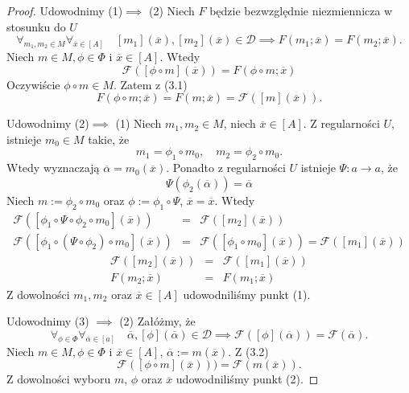 \documentclass[12pt,a4paper]{report}
\newcommand{\domkniecie}[1]{\left[ {#1} \right] }
\begin{document}
\begin{proof}
Udowodnimy (1)$\implies$ (2)
Niech $F$ będzie bezwzględnie niezmiennicza w stosunku do $U$
\begin{equation}
\forall_{m_{1}, m_{2} \in M}  \forall_{\overline{x} \in \domkniecie{A}} \quad \domkniecie{m_1}(\overline{x}), \domkniecie{m_2}(\overline{x})\in \mathcal{D} \implies F(m_{1};\overline{x})=F(m_{2};\overline{x}).
\end{equation}
Niech $m \in M, \phi \in \Phi$ i $\overline{x} \in \domkniecie{A}$. Wtedy
$$
\mathcal{F}(\domkniecie{\phi \circ m}(\overline{x}))=F(\phi \circ m;\overline{x})
$$
Oczywiście $\phi \circ m \in M$. Zatem z (3.1)
$$
F(\phi \circ m; \overline{x})=F(m;\overline{x})=\mathcal{F}(\domkniecie{m}(\overline{x})).
$$

Udowodnimy (2)$\implies$ (1)
Niech $m_1,m_2 \in M$, niech $\overline{x} \in\domkniecie{A}$.
Z regularności $U$, istnieje $m_0\in M$ takie, że
$$
m_1=\phi_1\circ m_0, \quad m_2=\phi_2\circ m_0.
$$
Wtedy wyznaczają $\overline{\alpha}=m_0(\overline{x})$.
Ponadto z regularności $U$ istnieje $\Psi:a\to a$, że
$$
 \Psi(\phi_2(\overline{\alpha}))=\overline{\alpha}
$$
Niech $m:=\phi_2\circ m_0$ oraz $\phi:=\phi_1\circ\Psi$, $\overline{x}=\overline{x}$. Wtedy
\begin{eqnarray*}
\mathcal{F}(\domkniecie{\phi_1\circ \Psi\circ \phi_2 \circ m_0}(\overline{x})) & = & \mathcal{F}(\domkniecie{m_2}(\overline{x})) \\
\mathcal{F}(\domkniecie{\phi_1\circ(\Psi\circ \phi_2)\circ m_0}(\overline{x})) & = & \mathcal{F}(\domkniecie{\phi_1\circ m_0}(\overline{x})) = \mathcal{F}(\domkniecie{m_1}(\overline{x}))
\end{eqnarray*}
\begin{eqnarray*}
\mathcal{F}(\domkniecie{m_2}(\overline{x})) & = & \mathcal{F}(\domkniecie{m_1}(\overline{x}))\\
F(m_2;\overline{x}) & = & F(m_1;\overline{x})
\end{eqnarray*}
Z dowolności $m_1,m_2$ oraz $\overline{x} \in \domkniecie{A}$ udowodniliśmy punkt (1).

Udowodnimy (3) $\implies$ (2)
Załóżmy, że
\begin{equation}
\forall_{\phi \in \Phi} \forall_{\overline{\alpha} \in \domkniecie{a}} \quad \overline{\alpha}, \domkniecie{\phi}(\overline{\alpha})\in \mathcal{D} \implies \mathcal{F}(\domkniecie{\phi}(\overline{\alpha}))=\mathcal{F}(\overline{\alpha}).
\end{equation}
Niech $m\in M, \phi \in \Phi$ i $\overline{x} \in\domkniecie{A}$, $\overline{\alpha}:=m(\overline{x})$. Z (3.2)
$$
 \mathcal{F}(\domkniecie{\phi\circ m}(\overline{x})))=\mathcal{F}(m(\overline{x})).
$$
Z dowolności wyboru $m$, $\phi$ oraz $\overline{x}$ udowodniliśmy punkt (2).


\end{proof}
\end{document}
